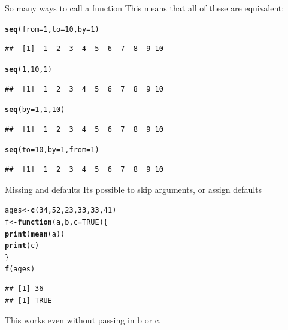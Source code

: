 \documentclass{beamer}\usepackage[]{graphicx}\usepackage[]{color}
\makeatletter
\newcommand{\hlnum}[1]{\textcolor[rgb]{0.686,0.059,0.569}{#1}}%
\newcommand{\hlstd}[1]{\textcolor[rgb]{0.345,0.345,0.345}{#1}}%
\newcommand{\hlkwa}[1]{\textcolor[rgb]{0.161,0.373,0.58}{\textbf{#1}}}%
\newcommand{\hlkwb}[1]{\textcolor[rgb]{0.69,0.353,0.396}{#1}}%
\newcommand{\hlkwc}[1]{\textcolor[rgb]{0.333,0.667,0.333}{#1}}%
\newcommand{\hlkwd}[1]{\textcolor[rgb]{0.737,0.353,0.396}{\textbf{#1}}}%
\newenvironment{kframe}{%
 \def\at@end@of@kframe{}%
 \ifinner\ifhmode%
  \def\at@end@of@kframe{\end{minipage}}%
  \begin{minipage}{\columnwidth}%
 \fi\fi%
 \def\FrameCommand##1{\hskip\@totalleftmargin \hskip-\fboxsep
 \colorbox{shadecolor}{##1}\hskip-\fboxsep
     \hskip-\linewidth \hskip-\@totalleftmargin \hskip\columnwidth}%
 \MakeFramed {\advance\hsize-\width
   \@totalleftmargin\z@ \linewidth\hsize
   \@setminipage}}%
 {\par\unskip\endMakeFramed%
 \at@end@of@kframe}
\newenvironment{knitrout}{}{} %
\makeatother
\begin{document}
\begin{frame}[fragile]{So many ways to call a function}
This means that all of these are equivalent:
\begin{knitrout}
\color{fgcolor}\begin{kframe}
\begin{alltt}
\hlkwd{seq}\hlstd{(}\hlkwc{from}\hlstd{=}\hlnum{1}\hlstd{,} \hlkwc{to}\hlstd{=}\hlnum{10}\hlstd{,} \hlkwc{by}\hlstd{=}\hlnum{1}\hlstd{)}
\end{alltt}
\begin{verbatim}
##  [1]  1  2  3  4  5  6  7  8  9 10
\end{verbatim}
\begin{alltt}
\hlkwd{seq}\hlstd{(}\hlnum{1}\hlstd{,}\hlnum{10}\hlstd{,}\hlnum{1}\hlstd{)}
\end{alltt}
\begin{verbatim}
##  [1]  1  2  3  4  5  6  7  8  9 10
\end{verbatim}
\begin{alltt}
\hlkwd{seq}\hlstd{(}\hlkwc{by}\hlstd{=}\hlnum{1}\hlstd{,}\hlnum{1}\hlstd{,}\hlnum{10}\hlstd{)}
\end{alltt}
\begin{verbatim}
##  [1]  1  2  3  4  5  6  7  8  9 10
\end{verbatim}
\begin{alltt}
\hlkwd{seq}\hlstd{(}\hlkwc{to}\hlstd{=}\hlnum{10}\hlstd{,}\hlkwc{by}\hlstd{=}\hlnum{1}\hlstd{,}\hlkwc{from}\hlstd{=}\hlnum{1}\hlstd{)}
\end{alltt}
\begin{verbatim}
##  [1]  1  2  3  4  5  6  7  8  9 10
\end{verbatim}
\end{kframe}
\end{knitrout}
\end{frame}


\begin{frame}[fragile]{Missing and defaults}
Its possible to skip arguments, or assign defaults
\begin{knitrout}
\color{fgcolor}\begin{kframe}
\begin{alltt}
\hlstd{ages} \hlkwb{<-} \hlkwd{c}\hlstd{(}\hlnum{34}\hlstd{,} \hlnum{52}\hlstd{,} \hlnum{23}\hlstd{,} \hlnum{33}\hlstd{,} \hlnum{33}\hlstd{,} \hlnum{41}\hlstd{)}
\hlstd{f} \hlkwb{<-} \hlkwa{function}\hlstd{(}\hlkwc{a}\hlstd{,}\hlkwc{b}\hlstd{,}\hlkwc{c}\hlstd{=}\hlnum{TRUE}\hlstd{)\{}
    \hlkwd{print}\hlstd{(}\hlkwd{mean}\hlstd{(a))}
    \hlkwd{print}\hlstd{(c)}
\hlstd{\}}
\hlkwd{f}\hlstd{(ages)}
\end{alltt}
\begin{verbatim}
## [1] 36
## [1] TRUE
\end{verbatim}
\end{kframe}
\end{knitrout}
This works even without passing in b or c.
\end{frame}
\end{document}
